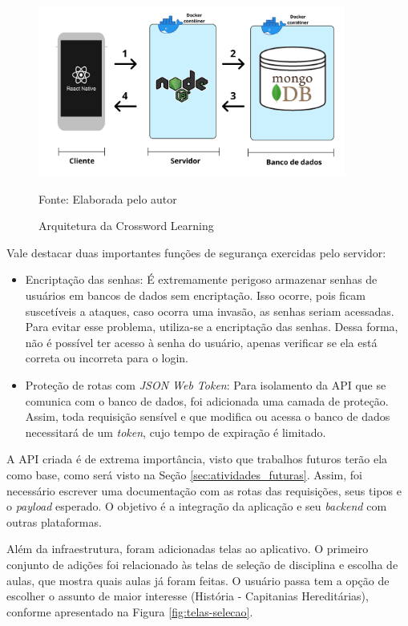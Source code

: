 \begin{figure}[H]
\centering
    \caption{Arquitetura da Crossword Learning}
    \label{fig:arquitetura}
    \includegraphics[width=0.9\textwidth]{Figuras/crossword-archictecture.png}
    
    Fonte: Elaborada pelo autor
\end{figure}

Vale destacar duas importantes funções de segurança exercidas pelo servidor:
\begin{itemize}
    \item Encriptação das senhas: É extremamente perigoso armazenar senhas de usuários em bancos de dados sem encriptação. Isso ocorre, pois ficam suscetíveis a ataques, caso ocorra uma invasão, as senhas seriam acessadas. Para evitar esse problema, utiliza-se a encriptação das senhas. Dessa forma, não é possível ter acesso à senha do usuário, apenas verificar se ela está correta ou incorreta para o login.
    
    \item Proteção de rotas com \textit{JSON Web Token}: Para isolamento da API que se comunica com o banco de dados, foi adicionada uma camada de proteção. Assim, toda requisição sensível e que modifica ou acessa o banco de dados necessitará de um \textit{token}, cujo tempo de expiração é limitado.
\end{itemize}

A API criada é de extrema importância, visto que trabalhos futuros terão ela como base, como será visto na Seção \ref{sec:atividades_futuras}. Assim, foi necessário escrever uma documentação com as rotas das requisições, seus tipos e o \textit{payload} esperado. O objetivo é a integração da aplicação e seu \textit{backend} com outras plataformas.

Além da infraestrutura, foram adicionadas telas ao aplicativo. O primeiro conjunto de adições foi relacionado às telas de seleção de disciplina e escolha de aulas, que mostra quais aulas já foram feitas. O usuário passa tem a opção de escolher o assunto de maior interesse (História - Capitanias Hereditárias), conforme apresentado na Figura \ref{fig:telas-selecao}.

